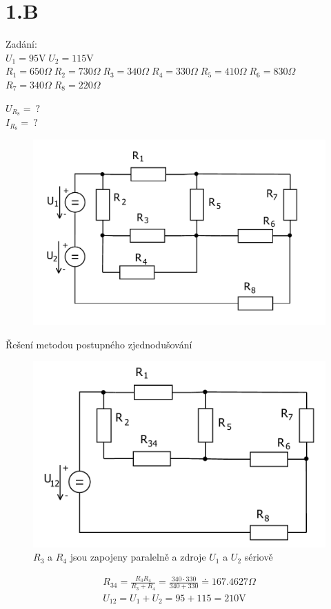 \section*{1.B}

	{\Large Zadání:} \\
	$U_1 = 95 \text{V} \; U_2=115 \text{V}$ \\
	$R_1 = 650 \Omega \; R_2 = 730 \Omega \; R_3 = 340 \Omega \;
	R_4 = 330 \Omega \; R_5 = 410 \Omega \; R_6 =830 \Omega$ \\
	$R_7 = 340 \Omega \; R_8 = 220 \Omega$

	$U_{R_8} = \: \text{?}$ \\
	$I_{R_8} = \: \text{?}$ \\

	\begin{figure}[H] 
		\vspace{-1.1cm}
		\center\includegraphics[width=0.6\linewidth]{obr/1_1}
	\end{figure}

	{\Large Řešení metodou postupného zjednodušování}\\

	\begin{figure}[H]
		\center\includegraphics[width=0.6\linewidth]{obr/1_2}
		\caption*{$R_3$ a $R_4$ jsou zapojeny paralelně a zdroje $U_1$ a $U_2$ sériově }
	\end{figure}
	\begin{gather*}
		R_{34} = \frac{R_3 R_4}{R_3 + R_4} =\frac{340 \cdot 330}{340 + 330} \doteq 167.4627 \Omega \\
		U_{12} = {U_1 + U_2} = {95 + 115} = 210  \text{V}
	\end{gather*}


